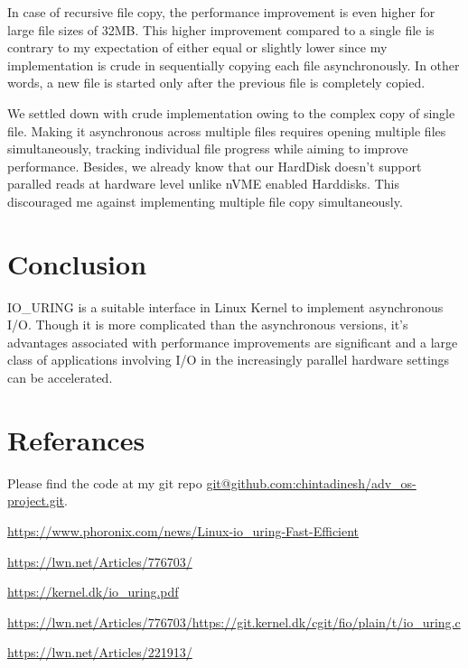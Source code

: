 \documentclass{article}
\begin{document}
In case of recursive file copy, the performance improvement is even higher for large file sizes of 32MB. This higher improvement 
compared to a single file is contrary to my expectation of either equal or slightly lower since my implementation is crude in 
sequentially copying each file asynchronously. In other words, a new file is started only after the previous file is completely 
copied.

We settled down with crude implementation owing to the complex copy of single file. Making it asynchronous across multiple files 
requires opening multiple files simultaneously, tracking individual file progress while aiming to improve performance. Besides, 
we already know that our HardDisk doesn’t support paralled reads at hardware level unlike nVME enabled Harddisks. This discouraged 
me against implementing multiple file copy simultaneously.


\section{Conclusion}
IO\_URING is a suitable interface in Linux Kernel to implement asynchronous I/O. Though it is more complicated than the 
asynchronous versions, it’s advantages associated with performance improvements are significant and a large class of applications 
involving I/O in the increasingly parallel hardware settings can be accelerated.

\section{Referances}



Please find the code at my git repo \href{git@github.com:chintadinesh/adv\_os-project.git}{git@github.com:chintadinesh/adv\_os-project.git}.

\href{https://www.phoronix.com/news/Linux-io\_uring-Fast-Efficient}{https://www.phoronix.com/news/Linux-io\_uring-Fast-Efficient}

\href{https://lwn.net/Articles/776703/}{https://lwn.net/Articles/776703/}

\href{https://kernel.dk/io\_uring.pdf}{https://kernel.dk/io\_uring.pdf}

\href{https://lwn.net/Articles/776703/https://git.kernel.dk/cgit/fio/plain/t/io\_uring.c}{https://lwn.net/Articles/776703/https://git.kernel.dk/cgit/fio/plain/t/io\_uring.c}

\href{https://lwn.net/Articles/221913/}{https://lwn.net/Articles/221913/}
\end{document}

